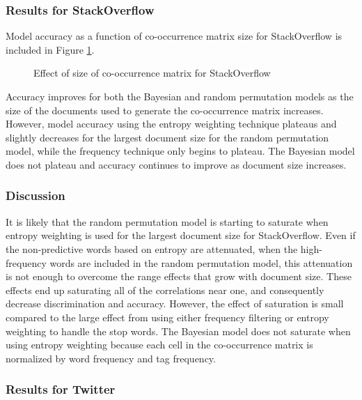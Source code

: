 \documentclass[man,floatsintext,donotrepeattitle]{apa6}
\begin{document}
\subsubsection{Results for StackOverflow}

Model accuracy as a function of co-occurrence matrix size for StackOverflow is included in Figure \ref{figContextDocumentSizeSO}.

\begin{figure}[!htbp]
  \caption{Effect of size of co-occurrence matrix for StackOverflow}
  \label{figContextDocumentSizeSO}
\end{figure}

Accuracy improves for both the Bayesian and random permutation models as the size of the documents used to generate the co-occurrence matrix increases.
However, model accuracy using the entropy weighting technique plateaus and slightly decreases for the largest document size for the random permutation model, while the frequency technique only begins to plateau. 
The Bayesian model does not plateau and accuracy continues to improve as document size increases.

\subsubsection{Discussion}

It is likely that the random permutation model is starting to saturate when entropy weighting is used for the largest document size for StackOverflow.
Even if the non-predictive words based on entropy are attenuated,
when the high-frequency words are included in the random permutation model,
this attenuation is not enough to overcome the range effects that grow with document size.
These effects end up saturating all of the correlations near one, and consequently decrease discrimination and accuracy.
However, the effect of saturation is small compared to the large effect from using either frequency filtering or entropy weighting to handle the stop words.
The Bayesian model does not saturate when using entropy weighting because each cell in the co-occurrence matrix is normalized by word frequency and tag frequency.

\subsubsection{Results for Twitter}
\end{document}
